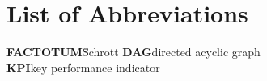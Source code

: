 \chapter*{List of Abbreviations}

\begin{tabbing}
\textbf{FACTOTUM}\hspace{1cm}\=Schrott\kill
\textbf{DAG}\>directed acyclic graph\\
\textbf{KPI}\>key performance indicator\\
\end{tabbing}

